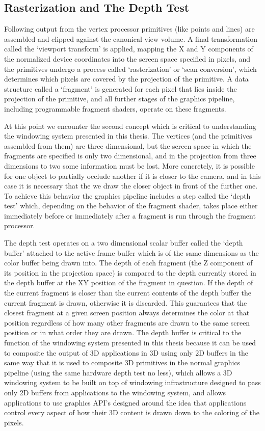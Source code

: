 \subsection{Rasterization and The Depth Test}
\label{sec:depth-test}
Following output from the vertex processor primitives (like points and lines) are assembled and clipped against the canonical view volume. A final transformation called the `viewport transform' is applied, mapping the X and Y components of the normalized device coordinates into the screen space specified in pixels, and the primitives undergo a process called `rasterization' or `scan conversion', which determines which pixels are covered by the projection of the primitive. A data structure called a `fragment' is generated for each pixel that lies inside the projection of the primitive, and all further stages of the graphics pipeline, including programmable fragment shaders, operate on these fragments. 

At this point we encounter the second concept which is critical to understanding the windowing system presented in this thesis. The vertices (and the primitives assembled from them) are three dimensional, but the screen space in which the fragments are specified is only two dimensional, and in the projection from three dimensions to two some information must be lost. More concretely, it is possible for one object to partially occlude another if it is closer to the camera, and in this case it is necessary that the we draw the closer object in front of the further one. To achieve this behavior the graphics pipeline includes a step called the `depth test' which, depending on the behavior of the fragment shader, takes place either immediately before or immediately after a fragment is run through the fragment processor.

The depth test operates on a two dimensional scalar buffer called the `depth buffer' attached to the active frame buffer which is of the same dimensions as the color buffer being drawn into. The depth of each fragment (the Z component of its position in the projection space) is compared to the depth currently stored in the depth buffer at the XY position of the fragment in question. If the depth of the current fragment is closer than the current contents of the depth buffer the current fragment is drawn, otherwise it is discarded. This guarantees that the closest fragment at a given screen position always determines the color at that position regardless of how many other fragments are drawn to the same screen position or in what order they are drawn. 
The depth buffer is critical to the function of the windowing system presented in this thesis because it can be used to composite the output of 3D applications in 3D using only 2D buffers in the same way that it is used to composite 3D primitives in the normal graphics pipeline (using the same hardware depth test no less), which allows a 3D windowing system to be built on top of windowing infrastructure designed to pass only 2D buffers from applications to the windowing system, and allows applications to use graphics API's designed around the idea that applications control every aspect of how their 3D content is drawn down to the coloring of the pixels.

